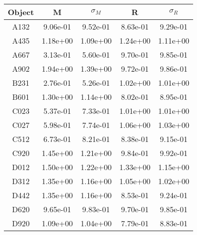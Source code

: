 \small
\vspace{-1cm}
\begin{tabular}{ccccc}
\hline
Object & M & $\sigma_{M}$ & R & $\sigma_{R}$ \\
\hline
A132 & 9.06e-01 & 9.52e-01 & 8.63e-01 & 9.29e-01 \\
A435 & 1.18e+00 & 1.09e+00 & 1.24e+00 & 1.11e+00 \\
A667 & 3.13e-01 & 5.60e-01 & 9.70e-01 & 9.85e-01 \\
A902 & 1.94e+00 & 1.39e+00 & 9.72e-01 & 9.86e-01 \\
B231 & 2.76e-01 & 5.26e-01 & 1.02e+00 & 1.01e+00 \\
B601 & 1.30e+00 & 1.14e+00 & 8.02e-01 & 8.95e-01 \\
C023 & 5.37e-01 & 7.33e-01 & 1.01e+00 & 1.01e+00 \\
C027 & 5.98e-01 & 7.74e-01 & 1.06e+00 & 1.03e+00 \\
C512 & 6.73e-01 & 8.21e-01 & 8.38e-01 & 9.15e-01 \\
C920 & 1.45e+00 & 1.21e+00 & 9.84e-01 & 9.92e-01 \\
D012 & 1.50e+00 & 1.22e+00 & 1.33e+00 & 1.15e+00 \\
D312 & 1.35e+00 & 1.16e+00 & 1.05e+00 & 1.02e+00 \\
D442 & 1.35e+00 & 1.16e+00 & 8.53e-01 & 9.24e-01 \\
D620 & 9.65e-01 & 9.83e-01 & 9.70e-01 & 9.85e-01 \\
D920 & 1.09e+00 & 1.04e+00 & 7.79e-01 & 8.83e-01 \\
\hline

\end{tabular}
